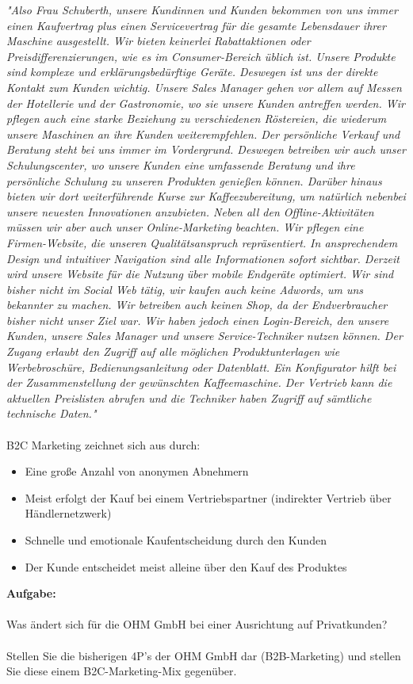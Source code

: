 {\textit{"Also Frau Schuberth, unsere Kundinnen und Kunden bekommen von uns immer einen Kaufvertrag plus einen Servicevertrag für die gesamte Lebensdauer ihrer Maschine ausgestellt. Wir bieten keinerlei Rabattaktionen oder Preisdifferenzierungen, wie es im Consumer-Bereich üblich ist. Unsere Produkte sind komplexe und erklärungsbedürftige Geräte. Deswegen ist uns der direkte Kontakt zum Kunden wichtig. Unsere Sales Manager gehen vor allem auf Messen der Hotellerie und der Gastronomie, wo sie unsere Kunden antreffen werden. Wir pflegen auch eine starke Beziehung zu verschiedenen Röstereien, die wiederum unsere Maschinen an ihre Kunden weiterempfehlen. Der persönliche Verkauf und Beratung steht bei uns immer im Vordergrund. Deswegen betreiben wir auch unser Schulungscenter, wo unsere Kunden eine umfassende Beratung und ihre persönliche Schulung zu unseren Produkten genießen können. Darüber hinaus bieten wir dort weiterführende Kurse zur Kaffeezubereitung, um natürlich nebenbei unsere neuesten Innovationen anzubieten. Neben all den Offline-Aktivitäten müssen wir aber auch unser Online-Marketing beachten. Wir pflegen eine Firmen-Website, die unseren Qualitätsanspruch repräsentiert. In ansprechendem Design und intuitiver Navigation sind alle Informationen sofort sichtbar. Derzeit wird unsere Website für die Nutzung über mobile Endgeräte optimiert. Wir sind bisher nicht im Social Web tätig, wir kaufen auch keine Adwords, um uns bekannter zu machen. Wir betreiben auch keinen Shop, da der Endverbraucher bisher nicht unser Ziel war. Wir haben jedoch einen Login-Bereich, den unsere Kunden, unsere Sales Manager und unsere Service-Techniker nutzen können. Der Zugang erlaubt den Zugriff auf alle möglichen Produktunterlagen wie Werbebroschüre, Bedienungsanleitung oder Datenblatt. Ein Konfigurator hilft bei der Zusammenstellung der gewünschten Kaffeemaschine. Der Vertrieb kann die aktuellen Preislisten abrufen und die Techniker haben Zugriff auf sämtliche technische Daten."} 
\\~\\
B2C Marketing zeichnet sich aus durch:
\begin{itemize}
    \item Eine große Anzahl von anonymen Abnehmern
    \item Meist erfolgt der Kauf bei einem Vertriebspartner (indirekter Vertrieb über Händlernetzwerk)
    \item Schnelle und emotionale Kaufentscheidung durch den Kunden
    \item Der Kunde entscheidet meist alleine über den Kauf des Produktes
\end{itemize}
\noindent
\textbf{Aufgabe:} 
\\~\\
Was ändert sich für die OHM GmbH bei einer Ausrichtung auf Privatkunden? \\~\\
Stellen Sie die bisherigen 4P’s der OHM GmbH dar (B2B-Marketing) und stellen Sie diese einem B2C-Marketing-Mix gegenüber.

}
